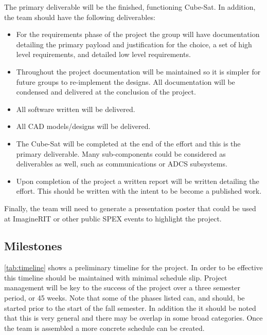 \documentclass[conference]{IEEEtran} %
\begin{document}
The primary deliverable will be the finished, functioning Cube-Sat.
In addition, the team should have the following deliverables:
\begin{itemize}
  \item For the requirements phase of the project the group will have documentation detailing the primary payload and justification for the choice, a set of high level requirements, and detailed low level requirements.
  \item Throughout the project documentation will be maintained so it is simpler for future groups to re-implement the designs.  All documentation will be condensed and delivered at the conclusion of the project.
  \item All software written will be delivered.
  \item All CAD models/designs will be delivered.
  \item The Cube-Sat will be completed at the end of the effort and this is the primary deliverable.  Many sub-components could be considered as deliverables as well, such as communications or ADCS subsystems.
  \item Upon completion of the project a written report will be written detailing the effort.  This should be written with the intent to be become a published work.
\end{itemize}

Finally, the team will need to generate a presentation poster that could be used at ImagineRIT or other public SPEX events to highlight the project.

\subsection{Milestones}
\label{subsec:milestones}

\autoref{tab:timeline} shows a preliminary timeline for the project.  In order to be effective this timeline should be maintained with minimal schedule slip.  Project management will be key to the success of the project over a three semester period, or 45 weeks.  Note that some of the phases listed can, and should, be started prior to the start of the fall semester.  In addition the it should be noted that this is very general and there may be overlap in some broad categories.  Once the team is assembled a more concrete schedule can be created.
\end{document}
